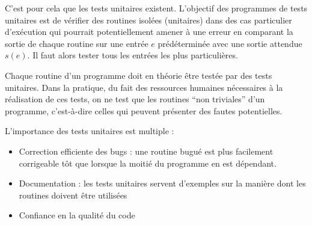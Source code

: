 \documentclass[../../../main.tex]{subfiles}
\begin{document}
C'est pour cela que les tests unitaires existent. L'objectif des programmes de tests unitaires est de
vérifier des routines isolées (unitaires) dans des cas particulier d'exécution qui pourrait potentiellement
amener à une erreur en comparant la sortie de chaque routine sur une entrée $e$ prédéterminée avec une
sortie attendue $s(e)$. Il faut alors tester tous les entrées les plus particulières.

Chaque routine d'un programme doit en théorie être testée par des tests unitaires. Dans la pratique,
du fait des ressources humaines nécessaires à la réalisation de ces tests, on ne test que les routines
``non triviales'' d'un programme, c'est-à-dire celles qui peuvent présenter des fautes potentielles.

L'importance des tests unitaires est multiple :
\begin{itemize}
	\item Correction efficiente des bugs : une routine bugué est plus facilement corrigeable tôt que lorsque
la moitié du programme en est dépendant.
	\item Documentation : les tests unitaires servent d'exemples sur la manière dont les routines doivent
être utilisées
	\item Confiance en la qualité du code
\end{itemize}
\end{document}
